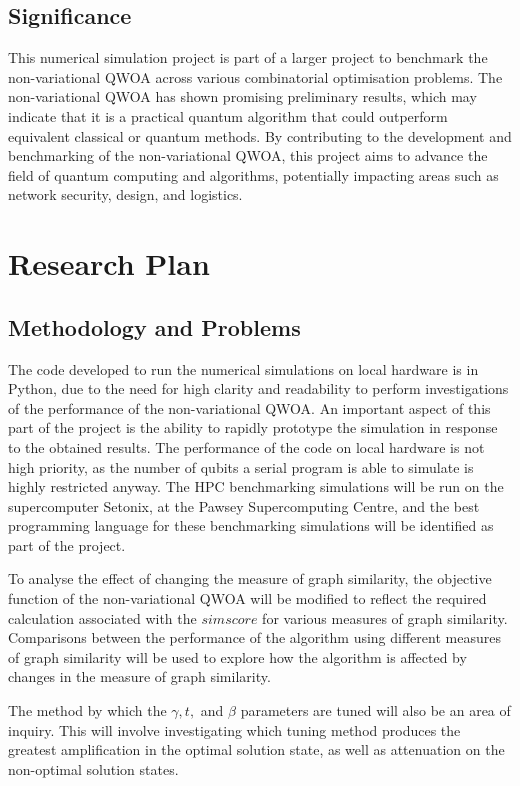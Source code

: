 \subsection{Significance}
This numerical simulation project is part of a larger project to benchmark the non-variational QWOA across various combinatorial optimisation problems. The non-variational QWOA has shown promising preliminary results, which may indicate that it is a practical quantum algorithm that could outperform equivalent classical or quantum methods. By contributing to the development and benchmarking of the non-variational QWOA, this project aims to advance the field of quantum computing and algorithms, potentially impacting areas such as network security, design, and logistics.

\section{Research Plan}
\subsection{Methodology and Problems}
The code developed to run the numerical simulations on local hardware is in Python, due to the need for high clarity and readability to perform investigations of the performance of the non-variational QWOA. An important aspect of this part of the project is the ability to rapidly prototype the simulation in response to the obtained results. The performance of the code on local hardware is not high priority, as the number of qubits a serial program is able to simulate is highly restricted anyway. The HPC benchmarking simulations will be run on the supercomputer Setonix, at the Pawsey Supercomputing Centre, and the best programming language for these benchmarking simulations will be identified as part of the project.

To analyse the effect of changing the measure of graph similarity, the objective function of the non-variational QWOA will be modified to reflect the required calculation associated with the $simscore$ for various measures of graph similarity. Comparisons between the performance of the algorithm using different measures of graph similarity will be used to explore how the algorithm is affected by changes in the measure of graph similarity.

The method by which the $\gamma, t,$ and $\beta$ parameters are tuned will also be an area of inquiry. This will involve investigating which tuning method produces the greatest amplification in the optimal solution state, as well as attenuation on the non-optimal solution states.

